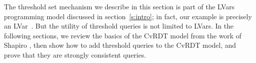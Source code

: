 The threshold set mechanism we describe in this section is 
part of the LVars programming model discussed in
section~\ref{s:intro}; in fact, our  example is precisely an
LVar~\cite{effectzoo}.  But the utility of threshold queries
is not limited to LVars.  In
the following sections, we review the basics of the CvRDT model from the work of
Shapiro \etal, then show how to add threshold queries to the CvRDT
model, and prove that they are strongly
consistent queries.

